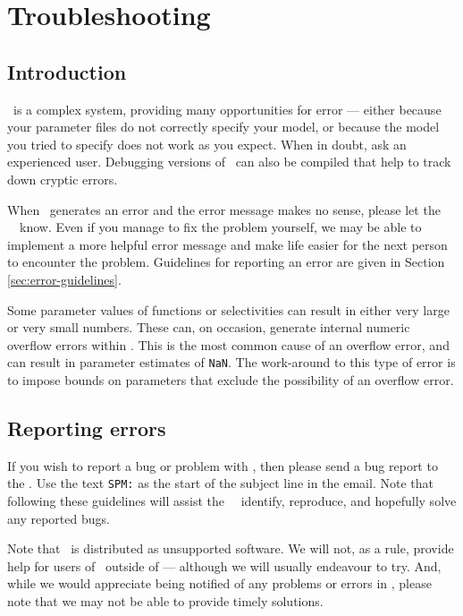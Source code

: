 \section{Troubleshooting\label{sec:trouble-shooting}}

\subsection{Introduction}

\SPM\ is a complex system, providing many opportunities for error --- either because your parameter files do not correctly specify your model, or because the model you tried to specify does not work as you expect. When in doubt, ask an experienced user. Debugging versions of \SPM\ can also be compiled that help to track down cryptic errors.

When \SPM\ generates an error and the error message makes no sense, please let the \SPM\ \authors\ know. Even if you manage to fix the problem yourself, we may be able to implement a more helpful error message and make life easier for the next person to encounter the problem. Guidelines for reporting an error are given in Section \ref{sec:error-guidelines}.

Some parameter values of functions or selectivities can result in either very large or very small numbers. These can, on occasion, generate internal numeric overflow errors within \SPM. This is the most common cause of an overflow error, and can result in parameter estimates of \texttt{NaN}. The work-around to this type of error is to impose bounds on parameters that exclude the possibility of an overflow error.

\subsection{Reporting errors\label{sec:reporting-errors}}

If you wish to report a bug or problem with \SPM, then please send a bug report to the \authors. Use the text \texttt{SPM:} as the start of the subject line in the email. Note that following these guidelines will assist the \SPM\ \authors\ identify, reproduce, and hopefully solve any reported bugs. 

Note that \SPM\ is distributed as unsupported software. We will not, as a rule, provide help for users of \SPM\ outside of \href{http://www.niwa.co.nz}{\Organisation} --- although we will usually endeavour to try. And, while we would appreciate being notified of any problems or errors in \SPM, please note that we may not be able to provide timely solutions.

